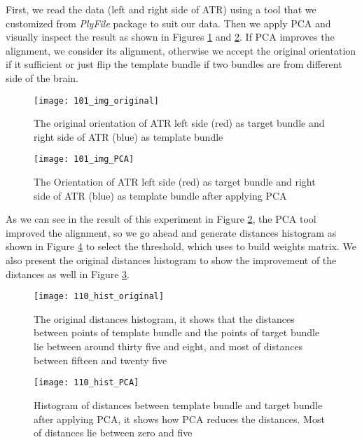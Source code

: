 \documentclass[../structure.tex]{subfiles}
\begin{document}
First, we read the data (left and right side of ATR) using a tool that we customized from \textit{PlyFile} package to suit our data. Then we apply PCA and visually inspect the result as shown in Figures \ref{fig:img_original} and \ref{fig:img_PCA}. If PCA improves the alignment, we consider its alignment, otherwise we accept the original orientation if it sufficient or just flip the template bundle if two bundles are from different side of the brain.

\begin{figure}[h!]
\centering
\texttt{[image: 101\_img\_original]}
\captionsetup{justification=centering}
\caption{The original orientation of ATR left side (red) as target bundle and right side of ATR (blue) as template bundle}
\label{fig:img_original}
\end{figure}

\begin{figure}[h!]
\centering
\texttt{[image: 101\_img\_PCA]}
\captionsetup{justification=centering}
\caption{The Orientation of ATR left side (red) as target bundle and right side of ATR (blue) as template bundle after applying PCA}
\label{fig:img_PCA}
\end{figure}

As we can see in the result of this experiment in Figure \ref{fig:img_PCA}, the PCA tool improved the alignment, so we go ahead and generate distances histogram as shown in Figure \ref{fig:hist_PCA} to select the threshold, which uses to build weights matrix. We also present the original distances histogram to show the improvement of the distances as well in Figure \ref{fig:hist_original}.

\begin{figure}[h!]
\centering
\texttt{[image: 110\_hist\_original]}
\captionsetup{justification=centering}
\caption{The original distances histogram, it shows that the distances between points of template bundle and the points of target bundle lie between around thirty five and eight, and most of distances between fifteen and twenty five}
\label{fig:hist_original}
\end{figure}

\begin{figure}[h!]
\centering
\texttt{[image: 110\_hist\_PCA]}
\captionsetup{justification=centering}
\caption{Histogram of distances between template bundle and target bundle after applying PCA, it shows how PCA reduces the distances. Most of distances lie between zero and five}
\label{fig:hist_PCA}
\end{figure}
\end{document}
